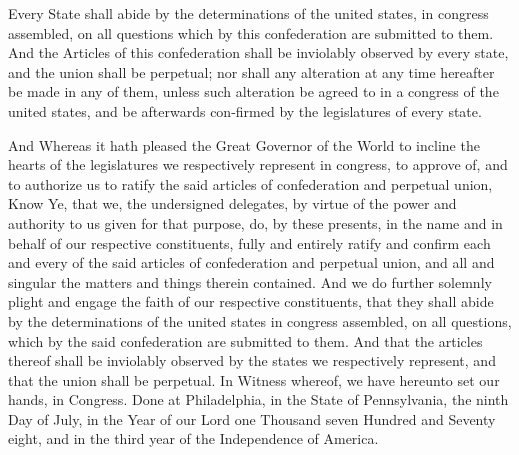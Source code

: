 Every State shall abide by the determinations of the united states, in congress assembled, on all questions which by this confederation are submitted to them. And the Articles of this confederation shall be inviolably observed by every state, and the union shall be perpetual; nor shall any alteration at any time hereafter be made in any of them, unless such alteration be agreed to in a congress of the united states, and be afterwards con-firmed by the legislatures of every state.

And Whereas it hath pleased the Great Governor of the World to incline the hearts of the legislatures we respectively represent in congress, to approve of, and to authorize us to ratify the said articles of confederation and perpetual union, Know Ye, that we, the undersigned delegates, by virtue of the power and authority to us given for that purpose, do, by these presents, in the name and in behalf of our respective constituents, fully and entirely ratify and confirm each and every of the said articles of confederation and perpetual union, and all and singular the matters and things therein contained. And we do further solemnly plight and engage the faith of our respective constituents, that they shall abide by the determinations of the united states in congress assembled, on all questions, which by the said confederation are submitted to them. And that the articles thereof shall be inviolably observed by the states we respectively represent, and that the union shall be perpetual. In Witness whereof, we have hereunto set our hands, in Congress. Done at Philadelphia, in the State of Pennsylvania, the ninth Day of July, in the Year of our Lord one Thousand seven Hundred and Seventy eight, and in the third year of the Independence of America.


